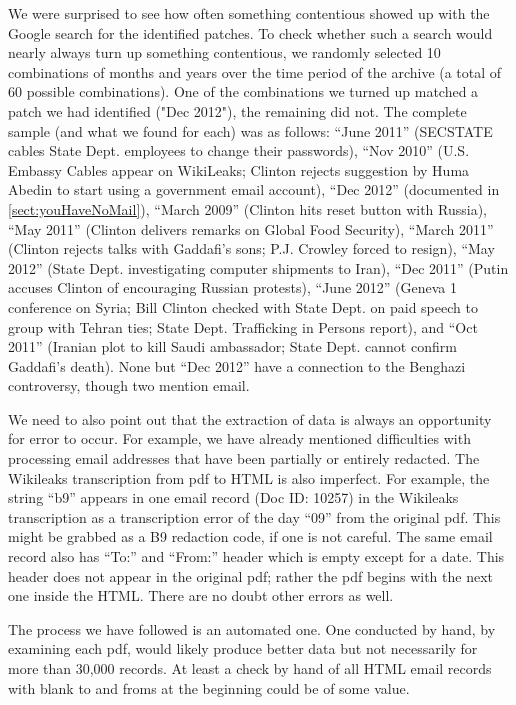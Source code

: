 \documentclass[journal]{vgtc}                %
\begin{document}
We were surprised to see how often something contentious showed up with the Google search for the identified patches.   To check whether such a search would nearly always turn up something contentious, we randomly selected 10 combinations of months and years over the time period of the archive (a total of 60 possible combinations).  One of the combinations we turned up matched a patch we had identified ("Dec 2012"), the remaining did not.  The complete sample (and what we found for each) was as follows:  ``June 2011''  (SECSTATE cables State Dept. employees to change their passwords), ``Nov 2010''  (U.S. Embassy Cables appear on WikiLeaks; Clinton rejects suggestion by Huma Abedin to start using  a government email account),   ``Dec 2012'' (documented in \autoref{sect:youHaveNoMail}), ``March 2009'' (Clinton hits reset button with Russia), ``May 2011'' (Clinton delivers remarks on Global Food Security), ``March 2011'' (Clinton rejects talks with Gaddafi's sons; P.J. Crowley forced to resign), ``May 2012'' (State Dept. investigating computer shipments to Iran), ``Dec 2011'' (Putin accuses Clinton of encouraging Russian protests), ``June 2012'' (Geneva 1 conference on Syria; Bill Clinton checked with State Dept. on paid speech to group with Tehran ties; State Dept. Trafficking in Persons report), and  ``Oct 2011'' (Iranian plot to kill Saudi ambassador; State Dept. cannot confirm Gaddafi's death).   None but ``Dec 2012'' have a connection to the Benghazi controversy, though two mention email.
 
 We need to also point out that the extraction of data is always an opportunity for error to occur.   For example, we have already mentioned difficulties with processing email addresses that have been partially or entirely redacted.  The Wikileaks transcription from pdf to HTML is also imperfect.  For example, the string ``b9''  appears in one email record (Doc ID: 10257) in the Wikileaks transcription\cite{errorWikileaks} as a transcription error of the day ``09'' from the original pdf.  This might be grabbed as a B9  redaction code, if one is not careful.  The same email record also has ``To:'' and ``From:'' header which is empty except for a date.  This header does not appear in the original pdf; rather the pdf begins with the next one inside the HTML.   There are no doubt other errors as well.  
 
 The process we have followed is an automated one.  One conducted by hand, by examining each pdf, would likely produce better data but not necessarily for more than 30,000 records.  At least a check by hand of all HTML email records with blank to and froms at the beginning could be of some value.
 
\end{document}
